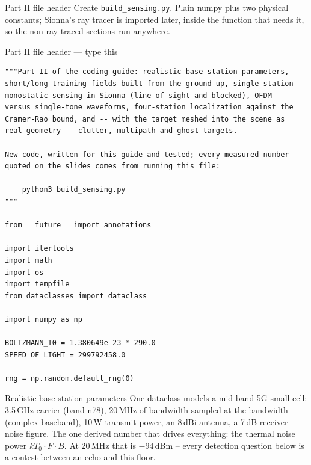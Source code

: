 \documentclass[10pt]{beamer}
\begin{document}
\begin{frame}{Part II file header}
  Create \texttt{build\_sensing.py}. Plain numpy plus two
  physical constants; Sionna's ray tracer is imported later,
  inside the function that needs it, so the non-ray-traced
  sections run anywhere.
\end{frame}

\begin{frame}[fragile]{Part II file header --- type this}
\begin{lstlisting}[basicstyle=\ttfamily\tiny]
"""Part II of the coding guide: realistic base-station parameters,
short/long training fields built from the ground up, single-station
monostatic sensing in Sionna (line-of-sight and blocked), OFDM
versus single-tone waveforms, four-station localization against the
Cramer-Rao bound, and -- with the target meshed into the scene as
real geometry -- clutter, multipath and ghost targets.

New code, written for this guide and tested; every measured number
quoted on the slides comes from running this file:

    python3 build_sensing.py
"""

from __future__ import annotations

import itertools
import math
import os
import tempfile
from dataclasses import dataclass

import numpy as np

BOLTZMANN_T0 = 1.380649e-23 * 290.0
SPEED_OF_LIGHT = 299792458.0

rng = np.random.default_rng(0)
\end{lstlisting}
\end{frame}

\begin{frame}{Realistic base-station parameters}
  One dataclass models a mid-band 5G small cell: 3.5\,GHz
  carrier (band n78), 20\,MHz of bandwidth sampled at the
  bandwidth (complex baseband), 10\,W transmit power, an
  8\,dBi antenna, a 7\,dB receiver noise figure. The one
  derived number that drives everything: the thermal noise
  power $kT_0 \cdot F \cdot B$. At 20\,MHz that is
  $-94$\,dBm -- every detection question below is a contest
  between an echo and this floor.
\end{frame}
\end{document}
